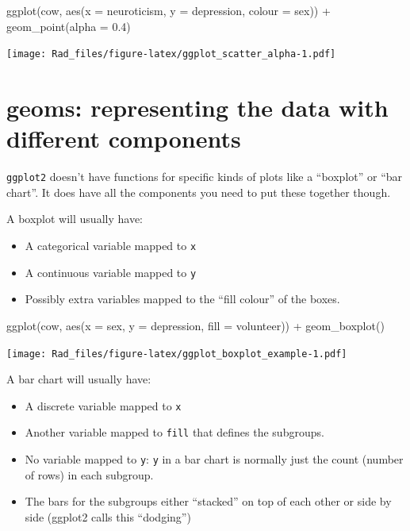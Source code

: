 \documentclass[
]{book}
\newenvironment{Shaded}{\begin{snugshade}}{\end{snugshade}}
\newcommand{\AttributeTok}[1]{\textcolor[rgb]{0.77,0.63,0.00}{#1}}
\newcommand{\FloatTok}[1]{\textcolor[rgb]{0.00,0.00,0.81}{#1}}
\newcommand{\FunctionTok}[1]{\textcolor[rgb]{0.00,0.00,0.00}{#1}}
\newcommand{\NormalTok}[1]{#1}
\newcommand{\SpecialCharTok}[1]{\textcolor[rgb]{0.00,0.00,0.00}{#1}}
\providecommand{\tightlist}{%
  \setlength{\itemsep}{0pt}\setlength{\parskip}{0pt}}
\begin{document}
\begin{Shaded}
\begin{Highlighting}[]
\FunctionTok{ggplot}\NormalTok{(cow, }
       \FunctionTok{aes}\NormalTok{(}\AttributeTok{x =}\NormalTok{ neuroticism, }\AttributeTok{y =}\NormalTok{ depression, }\AttributeTok{colour =}\NormalTok{ sex)) }\SpecialCharTok{+}
    \FunctionTok{geom\_point}\NormalTok{(}\AttributeTok{alpha =} \FloatTok{0.4}\NormalTok{)}
\end{Highlighting}
\end{Shaded}

\texttt{[image: Rad\_files/figure-latex/ggplot\_scatter\_alpha-1.pdf]}

\hypertarget{geoms-representing-the-data-with-different-components}{%
\section{geoms: representing the data with different components}\label{geoms-representing-the-data-with-different-components}}

\texttt{ggplot2} doesn't have functions for specific kinds of plots
like a ``boxplot'' or ``bar chart''. It does have all the components
you need to put these together though.

A boxplot will usually have:

\begin{itemize}
\tightlist
\item
  A categorical variable mapped to \texttt{x}
\item
  A continuous variable mapped to \texttt{y}
\item
  Possibly extra variables mapped to the ``fill colour'' of
  the boxes.
\end{itemize}

\begin{Shaded}
\begin{Highlighting}[]
\FunctionTok{ggplot}\NormalTok{(cow, }\FunctionTok{aes}\NormalTok{(}\AttributeTok{x =}\NormalTok{ sex, }\AttributeTok{y =}\NormalTok{ depression, }\AttributeTok{fill =}\NormalTok{ volunteer)) }\SpecialCharTok{+}
    \FunctionTok{geom\_boxplot}\NormalTok{()}
\end{Highlighting}
\end{Shaded}

\texttt{[image: Rad\_files/figure-latex/ggplot\_boxplot\_example-1.pdf]}

A bar chart will usually have:

\begin{itemize}
\tightlist
\item
  A discrete variable mapped to \texttt{x}
\item
  Another variable mapped to \texttt{fill} that defines
  the subgroups.
\item
  No variable mapped to \texttt{y}: \texttt{y} in a bar chart is
  normally just the count (number of rows) in
  each subgroup.
\item
  The bars for the subgroups either ``stacked'' on top
  of each other or side by side (ggplot2 calls this
  ``dodging'')
\end{itemize}
\end{document}
